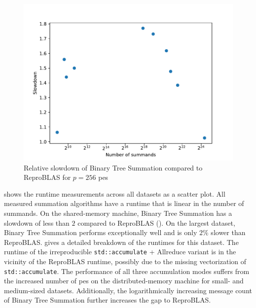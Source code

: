 \begin{figure}
\centering
\includegraphics[scale=0.75]{figures/slowdownPlot.pdf}
\caption{Relative slowdown of Binary Tree Summation compared to ReproBLAS for $p=256$ \glspl{pe}}
\label{fig:slowdownPlot}
\end{figure}

 shows the runtime measurements across all datasets as a scatter plot.
All measured summation algorithms have a runtime that is linear in the number of summands.
On the shared-memory machine, Binary Tree Summation has a slowdown of less than $2$ compared to ReproBLAS ().
On the largest dataset, Binary Tree Summation performs exceptionally well and is only $2\%$ slower than ReproBLAS.\@
{} gives a detailed breakdown of the runtimes for this dataset.
The runtime of the irreproducible \texttt{std::accumulate} + Allreduce variant is in the vicinity of the ReproBLAS runtime, possibly due to the missing vectorization of \texttt{std::accumulate}.
The performance of all three accumulation modes suffers from the increased number of \glspl{pe} on the distributed-memory machine for small- and medium-sized datasets.
Additionally, the logarithmically increasing message count of Binary Tree Summation further increases the gap to ReproBLAS.\@

